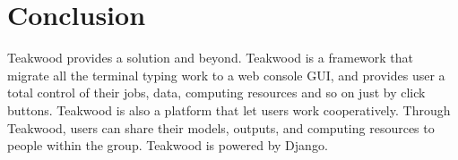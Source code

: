 \chapter{Conclusion}

Teakwood provides a solution and beyond. Teakwood is a framework that migrate all the terminal typing work to a web console GUI, and provides user a total control of their jobs, data, computing resources and so on just by click buttons. Teakwood is also a platform that let users work cooperatively. Through Teakwood, users can share their models, outputs, and computing resources to people within the group. Teakwood is powered by Django.
